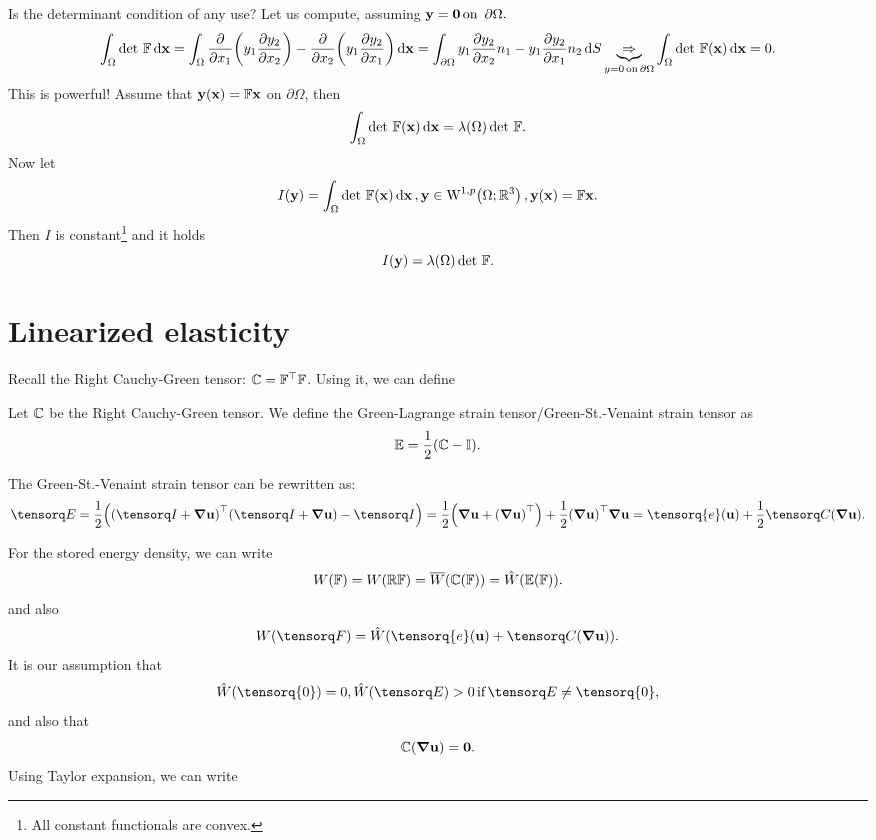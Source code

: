 \documentclass[11pt]{scrartcl} %
\begin{document}
Is the determinant condition of any use? Let us compute, assuming $\vb{y}= \vb{0} \, \text{on } \, \partial \Omega.$
\[
	\int_{\Omega}\det\, \mathbb{F}\dd{\vb{x}} = \int_{\Omega}\pdv{x_1}\qty(y_1 \pdv{y_2}{x_{2}})-\pdv{x_2}\qty(y_1 \pdv{y_2}{x_1})\dd{\vb{x}} = \int_{\partial \Omega}y_1 \pdv{y_2}{x_2}n_1 - y_1 \pdv{y_2}{x_1} n_2\dd{S} \underbrace{\Rightarrow}_{y=0 \, \text{on} \, \partial \Omega} \int_{\Omega}\det\, \mathbb{F}\qty(\vb{x})\dd{\vb{x}} = 0.
\]
This is powerful! Assume that $\vb{y}\qty(\vb{x}) = \mathbb{F} \vb{x}$ on $\partial \Omega$, then
\[
	\int_{\Omega}\det\, \mathbb{F}\qty(\vb{x})\dd{\vb{x}} = \lambda\qty(\Omega)\det\, \mathbb{F}.
\]
Now let
\[
	I\qty(\vb{y}) = \int_{\Omega}\detf\qty(\vb{x})\dd{\vb{x}}, \vb{y}\in \WkpSet[1][p]{\Omega; \R^3}, \vb{y}\qty(\vb{x}) = \fgrad \vb{x}.
\]
Then $I$ is constant\footnote{All constant functionals are convex.} and it holds
\[
	I\qty(\vb{y}) = \lambda\qty(\Omega)\det\, \mathbb{F}.
\]

\section{Linearized elasticity}
\label{sec:linearized_elasticity}

Recall the Right Cauchy-Green tensor: $\mathbb{C} = \mathbb{F}^\top\mathbb{F}$. Using it, we can define

\begin{theorem}
    Let $\mathbb{C}$ be the Right Cauchy-Green tensor. We define the Green-Lagrange strain tensor/Green-St.-Venaint strain tensor as
    \[
	    \mathbb{E} = \frac{1}{2}\qty(\mathbb{C} - \mathbb{I}).
    \]
\end{theorem}
\begin{remark}
    The Green-St.-Venaint strain tensor can be rewritten as:
    \[
	    \gsv = \frac{1}{2}\qty(\transpose{\qty(\identity+\grad \vb{u})}\qty(\identity + \grad \vb{u})- \identity) = \frac{1}{2}\qty(\grad \vb{u}+\transpose{\qty(\grad \vb{u})})+ \frac{1}{2}\transpose{\qty(\grad \vb{u})}\grad \vb{u} = \tensorq{e}\qty(\vb{u}) + \frac{1}{2}\rcg\qty(\grad \vb{u}).
    \]
\end{remark}
For the stored energy density, we can write
\[
	W\qty(\mathbb{F}) = W\qty(\mathbb{R}\mathbb{F}) = \overline{W}\qty(\mathbb{C}\qty(\mathbb{F})) = \hat{W}\qty(\mathbb{E}\qty(\mathbb{F})).
\]
and also
\[
	W\qty(\fgrad) = \hat{W}\qty(\tensorq{e}\qty(\vb{u})+\rcg\qty(\grad \vb{u})).
\]
It is our assumption that
\[
	\hat{W}\qty(\tensorq{0}) = 0, \hat{W}\qty(\gsv)>0 \, \text{if} \, \gsv \neq \tensorq{0},
\]
and also that
\[
	\mathbb{C}\qty(\grad \vb{u}) = \vb{0}.
\]
Using Taylor expansion, we can write
\end{document}
